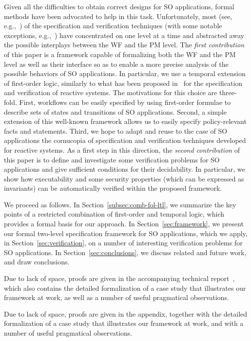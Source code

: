 \documentclass[conference]{IEEEtran}
\begin{document}
Given all the difficulties to obtain correct designs for SO
applications, formal methods have been advocated to help in this
task. Unfortunately, most (see, e.g.,~\cite{fisler06,ryan05}) of the
specification and verification techniques (with some notable
exceptions, e.g.,~\cite{schaad}) have concentrated on one level at a
time and abstracted away the possible interplays between the WF and the PM
level. The \emph{first contribution} of this paper is a framework
capable of formalizing both the WF and the PM level as well as their
interface so as to enable a more precise analysis of the possible
behaviors of SO applications.  In particular, we use a temporal
extension of first-order logic, similarly to what has been proposed
in~\cite{manna-pnueli-book} for the specification and verification of
reactive systems.  The motivations for this choice are
three-fold. First, workflows can be easily specified by using
first-order formulae to describe sets of states and transitions of SO
applications. Second, a simple extension of this well-known framework
allows us to easily specify policy-relevant facts and
statements. Third, we hope to adapt and reuse to the case of SO
applications the cornucopia of specification and verification
techniques developed for reactive systems.  As a first step in this
direction, the \emph{second contribution} of this paper is to define
and investigate some verification problems for SO applications and
give sufficient conditions for their decidability. In particular, we
show how executability and some security properties (which can be
expressed as invariants) can be automatically verified within the
proposed framework.

We proceed as follows. In Section~\ref{subsec:comb-fol-ltl}, we
summarize the key points of a restricted combination of first-order
and temporal logic, which provides a formal basis for our approach.
In Section~\ref{sec:framework}, we present our formal two-level
specification framework for SO applications, which we apply, in
Section~\ref{sec:verification}, on a number of interesting
verification problems for SO applications. In
Section~\ref{sec:conclusions}, we discuss related and future work, and
draw conclusions.
\begin{SHORT}
Due to lack of space, proofs are given in the accompanying technical report~\cite{BRV-TR09}, which also contains the detailed formalization of a case study that illustrates our framework at work, as well as a number of useful pragmatical observations.
\end{SHORT}
\begin{LONG}
Due to lack of space, proofs are given in the appendix, together with 
the detailed formalization of a case study that illustrates our framework at work, and with a number of useful pragmatical observations.
\end{LONG}
\end{document}
